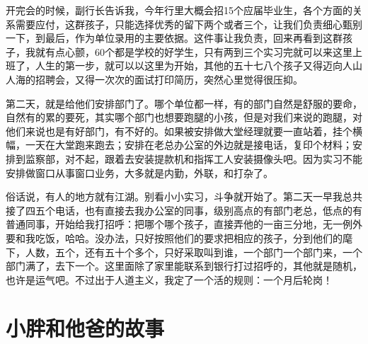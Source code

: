 开完会的时候，副行长告诉我，今年行里大概会招15个应届毕业生，各个方面的关系需要应付，这群孩子，只能选择优秀的留下两个或者三个，让我们负责细心甄别一下，到最后，作为单位录用的主要依据。这件事让我负责，回来再看到这群孩子，我就有点心颤，60个都是学校的好学生，只有两到三个实习完就可以来这里上班了，人生的第一步，就可以以这里为开始，其他的五十七八个孩子又得迈向人山人海的招聘会，又得一次次的面试打印简历，突然心里觉得很压抑。

第二天，就是给他们安排部门了。哪个单位都一样，有的部门自然是舒服的要命，自然有的累的要死，其实哪个部门也想要跑腿的小孩，但是对我们来说的跑腿，对他们来说也是有好部门，有不好的。如果被安排做大堂经理就要一直站着，挂个横幅，一天在大堂跑来跑去；安排在老总办公室的外边就是接电话，复印个材料；安排到监察部，对不起，跟着去安装提款机和指挥工人安装摄像头吧。因为实习不能安排做窗口从事窗口业务，大多就是内勤，外联，和打杂了。

俗话说，有人的地方就有江湖。别看小小实习，斗争就开始了。第二天一早我总共接了四五个电话，也有直接去我办公室的同事，级别高点的有部门老总，低点的有普通同事，开始给我打招呼：把哪个哪个孩子，直接弄他的一亩三分地，无一例外要和我吃饭，哈哈。没办法，只好按照他们的要求把相应的孩子，分到他们的麾下，人数，五个，还有五十个多个，只好采取叫到谁，一个部门一个部门来，一个部门满了，去下一个。这里面除了家里能联系到银行打过招呼的，其他就是随机，也许是运气吧。不过出于人道主义，我定了一个活的规则：一个月后轮岗！

\section{小胖和他爸的故事}

